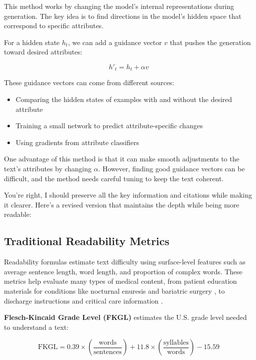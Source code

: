 This method works by changing the model's internal representations during generation. The key idea is to find directions in the model's hidden space that correspond to specific attributes.

For a hidden state $h_t$, we can add a guidance vector $v$ that pushes the generation toward desired attributes:

\begin{equation}
    h'_t = h_t + \alpha v
\end{equation}

These guidance vectors can come from different sources:
\begin{itemize}
    \item Comparing the hidden states of examples with and without the desired attribute
    \item Training a small network to predict attribute-specific changes
    \item Using gradients from attribute classifiers
\end{itemize}

One advantage of this method is that it can make smooth adjustments to the text's attributes by changing $\alpha$. However, finding good guidance vectors can be difficult, and the method needs careful tuning to keep the text coherent.


You're right, I should preserve all the key information and citations while making it clearer. Here's a revised version that maintains the depth while being more readable:

\subsection{Traditional Readability Metrics}
\label{subsec:traditional-metrics}

Readability formulas estimate text difficulty using surface-level features such as average sentence length, word length, and proportion of complex words. These metrics help evaluate many types of medical content, from patient education materials for conditions like nocturnal enuresis \cite{Fung2024-uh} and bariatric surgery \cite{Lucy2023-zi}, to discharge instructions \cite{Tuan2023-wc} and critical care information \cite{Hanci2024-wv}.

\textbf{Flesch-Kincaid Grade Level (FKGL)} estimates the U.S. grade level needed to understand a text:

\begin{equation}
    \text{FKGL} = 0.39 \times \left(\frac{\text{words}}{\text{sentences}}\right) + 11.8 \times \left(\frac{\text{syllables}}{\text{words}}\right) - 15.59
\end{equation}


